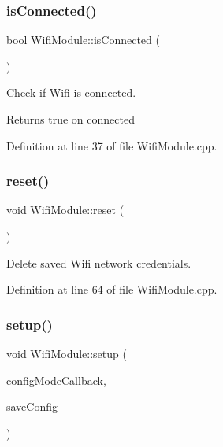 \subsubsection{\texorpdfstring{isConnected()}{isConnected()}}
{\footnotesize\ttfamily bool Wifi\+Module\+::is\+Connected (\begin{DoxyParamCaption}{ }\end{DoxyParamCaption})}



Check if Wifi is connected. 

\begin{DoxyReturn}{Returns}
true on connected 
\end{DoxyReturn}


Definition at line 37 of file Wifi\+Module.\+cpp.

\mbox{\label{class_wifi_module_af03089b54800669d9cc57d3ac8bf3188}} 
\subsubsection{\texorpdfstring{reset()}{reset()}}
{\footnotesize\ttfamily void Wifi\+Module\+::reset (\begin{DoxyParamCaption}{ }\end{DoxyParamCaption})}



Delete saved Wifi network credentials. 



Definition at line 64 of file Wifi\+Module.\+cpp.

\mbox{\label{class_wifi_module_a78a8fa5090dc159e070d32c957e661dd}} 
\subsubsection{\texorpdfstring{setup()}{setup()}}
{\footnotesize\ttfamily void Wifi\+Module\+::setup (\begin{DoxyParamCaption}\item[{void($\ast$)(Wi\+Fi\+Manager $\ast$my\+Wi\+Fi\+Manager)}]{config\+Mode\+Callback,  }\item[{void($\ast$)(void)}]{save\+Config }\end{DoxyParamCaption})}



